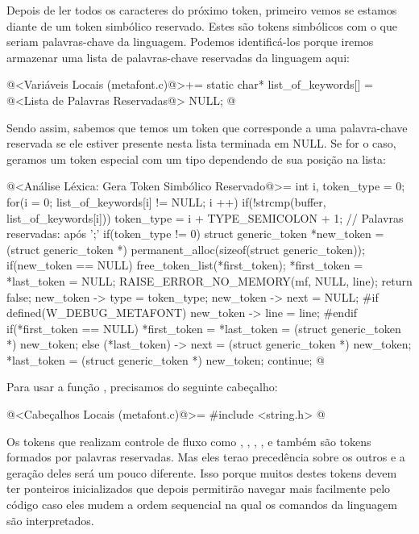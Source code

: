 Depois de ler todos os caracteres do próximo token, primeiro vemos se
estamos diante de um token simbólico reservado. Estes são tokens
simbólicos com o que seriam palavras-chave da linguagem. Podemos
identificá-los porque iremos armazenar uma lista de palavras-chave
reservadas da linguagem aqui:

\iniciocodigo
@<Variáveis Locais (metafont.c)@>+=
static char* list_of_keywords[] = {
@<Lista de Palavras Reservadas@>
  NULL};
@
\fimcodigo

Sendo assim, sabemos que temos um token que corresponde a uma
palavra-chave reservada se ele estiver presente nesta lista terminada
em NULL. Se for o caso, geramos um token especial com um tipo
dependendo de sua posição na lista:

\iniciocodigo
@<Análise Léxica: Gera Token Simbólico Reservado@>=
{
  int i, token_type = 0;
  for(i = 0; list_of_keywords[i] != NULL; i ++)
    if(!strcmp(buffer, list_of_keywords[i]))
      token_type = i + TYPE_SEMICOLON + 1; // Palavras reservadas: após ';'
  if(token_type != 0){
    struct generic_token *new_token =
       (struct generic_token *) permanent_alloc(sizeof(struct generic_token));
    if(new_token == NULL){
      free_token_list(*first_token);
      *first_token = *last_token = NULL;
      RAISE_ERROR_NO_MEMORY(mf, NULL, line);
      return false;
    }
    new_token -> type = token_type;
    new_token -> next = NULL;
#if defined(W_DEBUG_METAFONT)
    new_token -> line = line;
#endif
    if(*first_token == NULL)
      *first_token = *last_token = (struct generic_token *) new_token;
    else{
      (*last_token) -> next = (struct generic_token *) new_token;
      *last_token = (struct generic_token *) new_token;
    }
    continue;
  }
}
@
\fimcodigo

Para usar a função , precisamos do seguinte
cabeçalho:

\iniciocodigo
@<Cabeçalhos Locais (metafont.c)@>=
#include <string.h>
@
\fimcodigo

Os tokens que realizam controle de fluxo
como , , , ,
 e  também são tokens formados por palavras
reservadas. Mas eles terao precedência sobre os outros e a geração
deles será um pouco diferente. Isso porque muitos destes tokens devem
ter ponteiros inicializados que depois permitirão navegar mais
facilmente pelo código caso eles mudem a ordem sequencial na qual os
comandos da linguagem são interpretados.

